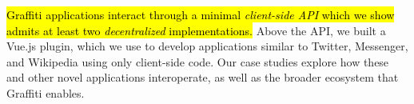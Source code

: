 {\hl{%
Graffiti applications interact through a minimal \emph{client-side API}
which we show admits at least two \emph{decentralized} implementations.
}}%
Above the API, we built a Vue.js plugin, which we use to
develop applications similar to Twitter, Messenger, and Wikipedia
using only client-side code.
Our case studies explore how these and other novel applications interoperate,
as well as the broader ecosystem that Graffiti enables.
